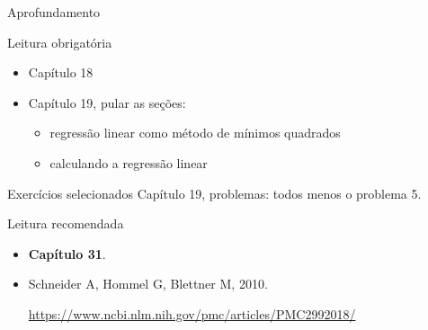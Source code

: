 \documentclass{beamer}
\begin{document}
\begin{frame}{Aprofundamento}
  \begin{block}{Leitura obrigatória}
    \begin{itemize}
      \footnotesize
    \item Capítulo 18
    \item Capítulo 19, pular as seções:
      \begin{itemize}
        \scriptsize
      \item regressão linear como método de mínimos quadrados
      \item calculando a regressão linear
      \end{itemize}
    \end{itemize}
  \end{block}
  \begin{block}{Exercícios selecionados}
    \footnotesize
    Capítulo 19, problemas: todos menos o problema 5.
  \end{block}
  \begin{block}{Leitura recomendada}
    \small
    
    \begin{itemize}
    \item {\bf Capítulo 31}.
      \scriptsize
    \item Schneider A, Hommel G, Blettner M, 2010.

      \url{https://www.ncbi.nlm.nih.gov/pmc/articles/PMC2992018/}

    \end{itemize}
  \end{block}
\end{frame}
\end{document}
